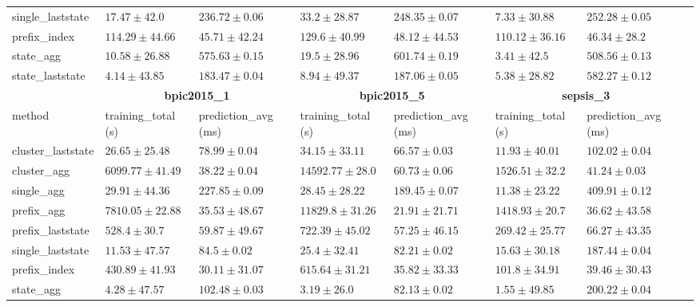 \documentclass[twoside,11pt]{Latex/Classes/PhDthesisPSnPDF}
\begin{document}
\begin{table}[h]
{\begin{tabular}{llllllll}
				single\_laststate & $17.47 \pm 42.0$ & $236.72 \pm 0.06$ & $33.2 \pm 28.87$ & $248.35 \pm 0.07$ & $7.33 \pm 30.88$ & $252.28 \pm 0.05$ \\ 
				prefix\_index & $114.29 \pm 44.66$ & $45.71 \pm 42.24$ & $129.6 \pm 40.99$ & $48.12 \pm 44.53$ & $110.12 \pm 36.16$ & $46.34 \pm 28.2$ \\ 
				state\_agg & $10.58 \pm 26.88$ & $575.63 \pm 0.15$ & $19.5 \pm 28.96$ & $601.74 \pm 0.19$ & $\mathbf{3.41 \pm 42.5}$ & $508.56 \pm 0.13$ \\ 
				state\_laststate & $\mathbf{4.14 \pm 43.85}$ & $183.47 \pm 0.04$ & $\mathbf{8.94 \pm 49.37}$ & $187.06 \pm 0.05$ & $5.38 \pm 28.82$ & $582.27 \pm 0.12$ \\ 
				\bottomrule
				\toprule
				& \multicolumn{2}{c}{{\bfseries bpic2015\_1}} & \multicolumn{2}{c}{{\bfseries bpic2015\_5}} & \multicolumn{2}{c}{{\bfseries sepsis\_3}} \\ \cmidrule(lr){2-3} \cmidrule(lr){4-5} \cmidrule(lr){6-7}
				method  & training\_total (s) & prediction\_avg (ms) & training\_total (s) & prediction\_avg (ms) & training\_total (s) & prediction\_avg (ms) \\ \midrule
				cluster\_laststate & $26.65 \pm 25.48$ & $78.99 \pm 0.04$ & $34.15 \pm 33.11$ & $66.57 \pm 0.03$ & $11.93 \pm 40.01$ & $102.02 \pm 0.04$ \\ 
				cluster\_agg & $6099.77 \pm 41.49$ & $38.22 \pm 0.04$ & $14592.77 \pm 28.0$ & $60.73 \pm 0.06$ & $1526.51 \pm 32.2$ & $41.24 \pm 0.03$ \\ 
				single\_agg & $29.91 \pm 44.36$ & $227.85 \pm 0.09$ & $28.45 \pm 28.22$ & $189.45 \pm 0.07$ & $11.38 \pm 23.22$ & $409.91 \pm 0.12$ \\ 
				prefix\_agg & $7810.05 \pm 22.88$ & $35.53 \pm 48.67$ & $11829.8 \pm 31.26$ & $\mathbf{21.91 \pm 21.71}$ & $1418.93 \pm 20.7$ & $\mathbf{36.62 \pm 43.58}$ \\ 
				prefix\_laststate & $528.4 \pm 30.7$ & $59.87 \pm 49.67$ & $722.39 \pm 45.02$ & $57.25 \pm 46.15$ & $269.42 \pm 25.77$ & $66.27 \pm 43.35$ \\ 
				single\_laststate & $11.53 \pm 47.57$ & $84.5 \pm 0.02$ & $25.4 \pm 32.41$ & $82.21 \pm 0.02$ & $15.63 \pm 30.18$ & $187.44 \pm 0.04$ \\ 
				prefix\_index & $430.89 \pm 41.93$ & $\mathbf{30.11 \pm 31.07}$ & $615.64 \pm 31.21$ & $35.82 \pm 33.33$ & $101.8 \pm 34.91$ & $39.46 \pm 30.43$ \\ 
				state\_agg & $\mathbf{4.28 \pm 47.57}$ & $102.48 \pm 0.03$ & $\mathbf{3.19 \pm 26.0}$ & $82.13 \pm 0.02$ & $\mathbf{1.55 \pm 49.85}$ & $200.22 \pm 0.04$ \\ 

\end{tabular}}
\end{table}
\end{document}

